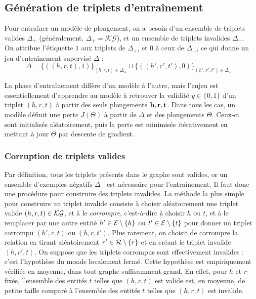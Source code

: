 \subsection{Génération de triplets d'entraînement}
\label{subsec:kge-data}

Pour entraîner un modèle de plongement, on a besoin d'un ensemble de triplets valides $\Delta_+$ (généralement, $\Delta_+ = \mathcal{KG}$), et un ensemble de triplets invalides $\Delta_-$. %
On attribue l'étiquette $1$ aux triplets de $\Delta_+$, et $0$ à ceux de $\Delta_-$, ce qui donne un jeu d'entraînement supervisé $\Delta$ :
\begin{equation}
    \Delta = \{((h, r, t), 1)\}_{(h, r, t) \in \Delta_+} \cup
       \{((h', r', t'), 0)\}_{(h', r', t') \in \Delta_-}
       \label{eq:kge-training-set}
\end{equation}


La phase d'entraînement diffère d'un modèle à l'autre, mais l'enjeu est essentiellement d'apprendre au modèle à retrouver la validité $y \in \{ 0, 1\}$ d'un triplet $(h, r, t)$ à partir des seuls plongements $\bf{h, r, t}$. Dans tous les cas, un modèle définit une perte $J(\Theta)$ à partir de $\Delta$ et des plongements $\Theta$. Ceux-ci sont initialisés aléatoirement, puis la perte est minimisée itérativement en mettant à jour $\Theta$ par descente de gradient.


\subsubsection{Corruption de triplets valides}
\label{subsec:kge-data-corruption}

Par définition, tous les triplets présents dans le graphe sont valides, or un ensemble d'exemples négatifs $\Delta_-$ est nécessaire pour l'entraînement. Il faut donc une procédure pour construire des triplets invalides. La méthode la plus simple pour construire un triplet invalide consiste à choisir aléatoirement une triplet valide $(h, r, t) \in \KG$, et à le \textit{corrompre}, c'est-à-dire à choisir $h$ ou $t$, et à le remplacer par une autre entité $h' \in \Ent \setminus \{ h \}$ ou $t' \in \Ent \setminus \{ t \}$ pour donner un triplet corrompu $(h', r, t)$ ou $(h, r, t')$. Plus rarement, on choisit de corrompre la relation en tirant aléatoirement $r' \in \Rel \setminus \{ r \}$ et en créant le triplet invalide $(h, r', t)$. On suppose que les triplets corrompus sont effectivement invalides : c'est l'hypothèse du monde localement fermé. Cette hypothèse est empiriquement vérifiée en moyenne, dans tout graphe suffisamment grand. En effet, pour $h$ et $r$ fixés, l'ensemble des entités $t$ telles que $(h, r, t)$ est valide est, en moyenne, de petite taille comparé à l'ensemble des entités $t$ telles que $(h, r, t)$ est invalide.

